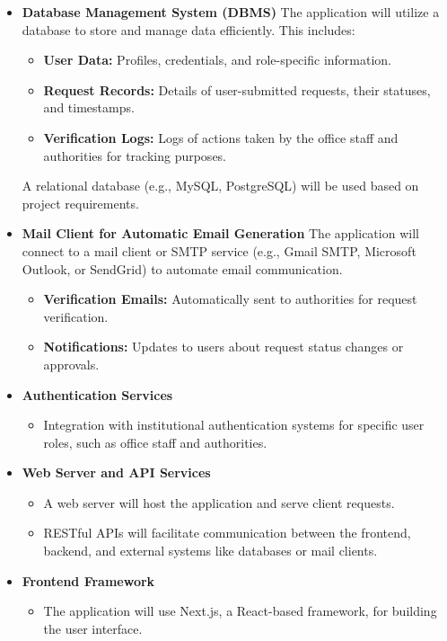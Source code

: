 \documentclass[a4paper,12pt]{article}
\begin{document}
\begin {itemize} 
    \item \textbf{Database Management System (DBMS)}
    The application will utilize a database to store and manage data efficiently. This includes:
        \begin{itemize} 
            \item \textbf{User Data:} Profiles, credentials, and role-specific information.
            \item \textbf{Request Records:} Details of user-submitted requests, their statuses, and timestamps.
            \item \textbf{Verification Logs:} Logs of actions taken by the office staff and authorities for tracking purposes.
        \end{itemize}
    A relational database (e.g., MySQL, PostgreSQL) will be used based on project requirements.
    
    \item \textbf{Mail Client for Automatic Email Generation}
    The application will connect to a mail client or SMTP service (e.g., Gmail SMTP, Microsoft Outlook, or SendGrid) to automate email communication.
        \begin{itemize} 
            \item \textbf{Verification Emails:} Automatically sent to authorities for request verification.
            \item \textbf{Notifications:} Updates to users about request status changes or approvals.
        \end{itemize}
    
    \item \textbf{Authentication Services}
    \begin{itemize} 
        \item Integration with institutional authentication systems for specific user roles, such as office staff and authorities.
    \end{itemize}
    
    \item \textbf{Web Server and API Services}
    \begin{itemize} 
        \item A web server will host the application and serve client requests.
        \item RESTful APIs will facilitate communication between the frontend, backend, and external systems like databases or mail clients.
    \end{itemize}
    
    \item \textbf{Frontend Framework}
    \begin{itemize} 
        \item The application will use Next.js, a React-based framework, for building the user interface.
    \end{itemize}
\end{itemize}
\end{document}
